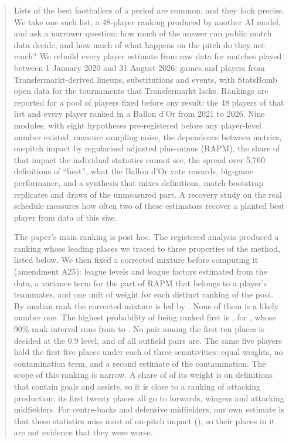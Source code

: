 \documentclass[11pt,a4paper]{article}
\begin{document}
\begin{abstract}
Lists of the best footballers of a period are common, and they look precise.
We take one such list, a 48-player ranking produced by another AI model, and
ask a narrower question: how much of the answer can public match data decide,
and how much of what happens on the pitch do they not reach? We rebuild every
player estimate from raw data for matches played between 1 January 2020 and
31 August 2026: \NGames{} games and \NPlayersPanel{} players from
Transfermarkt-derived lineups, substitutions and events, with StatsBomb open
data for the tournaments that Transfermarkt lacks. Rankings are reported for a
pool of \NPool{} players fixed before any result: the 48 players of that list
and every player ranked in a Ballon d'Or from 2021 to 2026. Nine modules, with
eight hypotheses pre-registered before any player-level number existed,
measure sampling noise, the dependence between metrics, on-pitch impact by
regularised adjusted plus-minus (RAPM), the share of that impact the
individual statistics cannot see, the spread over 5,760 definitions of
``best'', what the Ballon d'Or vote rewards, big-game performance, and a
synthesis that mixes definitions, match-bootstrap replicates and draws of the
unmeasured part. A recovery study on the real schedule measures how often two
of these estimators recover a planted best player from data of this size.

The paper's main ranking is post hoc. The registered analysis produced a
ranking whose leading places we traced to three properties of the method,
listed below. We then fixed a corrected mixture before computing it
(amendment A25): league levels and league factors estimated from the data, a
variance term for the part of RAPM that belongs to a player's teammates, and
one unit of weight for each distinct ranking of the pool. By median rank the
corrected mixture is led by \CorrectedTopFive{}. None of them is a likely
number one. The highest probability of being ranked first is
\CorrectedTopPFirst{}, for \CorrectedTopName{}, whose 90\% rank interval runs
from \CorrectedTopRankLo{} to \CorrectedTopRankHi{}. No pair among the first
ten places is decided at the 0.9 level, and \CorrectedSharePairsDecided{} of
all outfield pairs are. The same five players hold the first five places
under each of three sensitivities: equal weights, no contamination term, and a
second estimate of the contamination. The scope of this ranking is narrow. A
share of \CorrectedWeightBoxFamilies{} of its weight is on definitions that
contain goals and assists, so it is close to a ranking of attacking production: its
first twenty places all go to forwards, wingers and attacking midfielders. For
centre-backs and defensive midfielders, our own estimate is that these
statistics miss most of on-pitch impact (\ShareHigh{}), so their places in it
are not evidence that they were worse.


\end{abstract}
\end{document}
